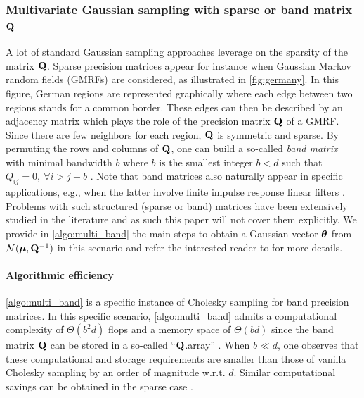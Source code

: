 \documentclass[nohypdvips,onefignum,onetabnum]{siamart171218}
\begin{document}
\subsubsection{Multivariate Gaussian sampling with sparse or band matrix $\mathbf{Q}$}
A lot of standard Gaussian sampling approaches leverage on the sparsity of the matrix $\mathbf{Q}$.
Sparse precision matrices appear for instance when Gaussian Markov random fields (GMRFs) are considered, as illustrated in \cref{fig:germany}.
In this figure, German regions are represented graphically where each edge between two regions stands for a common border.
These edges can then be described by an adjacency matrix which plays the role of the precision matrix $\mathbf{Q}$ of a GMRF. 
Since there are few neighbors for each region, $\mathbf{Q}$ is symmetric and sparse. 
By permuting the rows and columns of $\mathbf{Q}$, one can build a so-called \emph{band matrix} with minimal bandwidth $b$ where $b$ is the smallest integer $b<d$ such that $Q_{ij} = 0, \ \forall i > j + b$ \cite{Rue2001}.
Note that band matrices also naturally appear in specific applications, e.g., when the latter involve finite impulse response linear filters \cite{Idier2008}.
Problems with such structured (sparse or band) matrices have been extensively studied in the literature and as such this paper will not cover them explicitly. 
We provide in \cref{algo:multi_band} the main steps to obtain a Gaussian vector $\boldsymbol{\theta}$ from $\mathcal{N}(\boldsymbol{\mu},\mathbf{Q}^{-1})$ in this scenario and refer the interested reader to \cite{Rue2005} for more details.

\paragraph{Algorithmic efficiency}
\cref{algo:multi_band} is a specific instance of Cholesky sampling for band precision matrices.
In this specific scenario, \cref{algo:multi_band} admits a computational complexity of $\Theta(b^2d)$ flops and a memory space of $\Theta(bd)$ since the band matrix $\mathbf{Q}$ can be stored in a so-called ``$\mathbf{Q}$.array'' \cite[Section 1.2.5]{Golub1989}.
When $b \ll d$, one observes that these computational and storage requirements are smaller than those of vanilla Cholesky sampling by an order of magnitude w.r.t. $d$.
Similar computational savings can be obtained in the sparse case \cite{Rue2005}.
\end{document}
